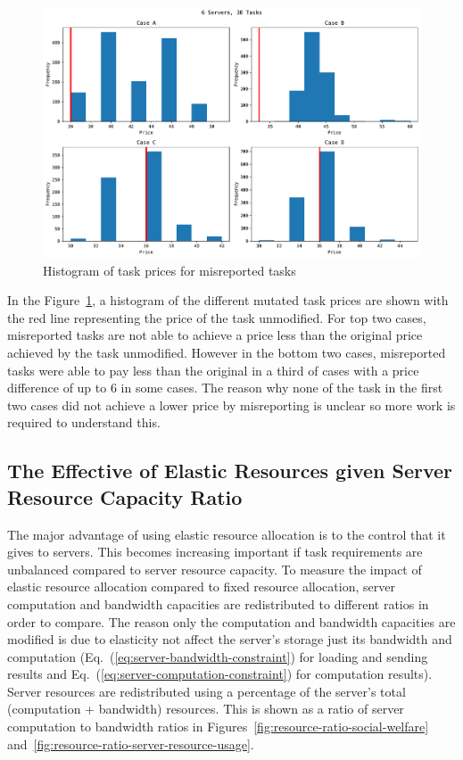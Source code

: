 \begin{figure}
    \centering
    \includegraphics[width=\linewidth]{figs/mutation/grid_search.pdf}
    \caption{Histogram of task prices for misreported tasks}
    \label{fig:mutation-grid-search}
\end{figure}

In the Figure~\ref{fig:mutation-grid-search}, a histogram of the different mutated task prices are shown with the red line
representing the price of the task unmodified. For top two cases, misreported tasks are not able to achieve a price
less than the original price achieved by the task unmodified. However in the bottom two cases, misreported tasks were able
to pay less than the original in a third of cases with a price difference of up to 6 in some cases. The reason why none of
the task in the first two cases did not achieve a lower price by misreporting is unclear so more work is required to
understand this.

\subsection{The Effective of Elastic Resources given Server Resource Capacity Ratio}
\label{subsec:the-effective-of-elastic-resources-given-server-resource-capacity-ratio}
The major advantage of using elastic resource allocation is to the control that it gives to servers. This becomes
increasing important if task requirements are unbalanced compared to server resource capacity. To measure the impact
of elastic resource allocation compared to fixed resource allocation, server computation and bandwidth capacities
are redistributed to different ratios in order to compare. The reason only the computation and bandwidth capacities
are modified is due to elasticity not affect the server's storage just its bandwidth and computation
(Eq.~(\ref{eq:server-bandwidth-constraint}) for loading and sending results and Eq.~(\ref{eq:server-computation-constraint})
for computation results). \\
Server resources are redistributed using a percentage of the server's total (computation + bandwidth) resources.
This is shown as a ratio of server computation to bandwidth ratios in Figures~\ref{fig:resource-ratio-social-welfare}
and~\ref{fig:resource-ratio-server-resource-usage}.

